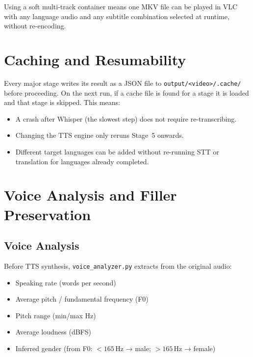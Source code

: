 \documentclass[12pt,a4paper]{article}
\begin{document}
Using a soft multi-track container means one MKV file can be played in VLC
with any language audio and any subtitle combination selected at runtime,
without re-encoding.

\section{Caching and Resumability}

Every major stage writes its result as a JSON file to
\texttt{output/<video>/.cache/} before proceeding.  On the next run,
if a cache file is found for a stage it is loaded and that stage is skipped.
This means:

\begin{itemize}
  \item A crash after Whisper (the slowest step) does not require
        re-transcribing.
  \item Changing the TTS engine only reruns Stage~5 onwards.
  \item Different target languages can be added without re-running STT or
        translation for languages already completed.
\end{itemize}

\section{Voice Analysis and Filler Preservation}

\subsection{Voice Analysis}

Before TTS synthesis, \texttt{voice\_analyzer.py} extracts from the original
audio:

\begin{itemize}
  \item Speaking rate (words per second)
  \item Average pitch / fundamental frequency (F0)
  \item Pitch range (min/max Hz)
  \item Average loudness (dBFS)
  \item Inferred gender (from F0: $<165$\,Hz → male; $>165$\,Hz → female)
\end{itemize}
\end{document}
